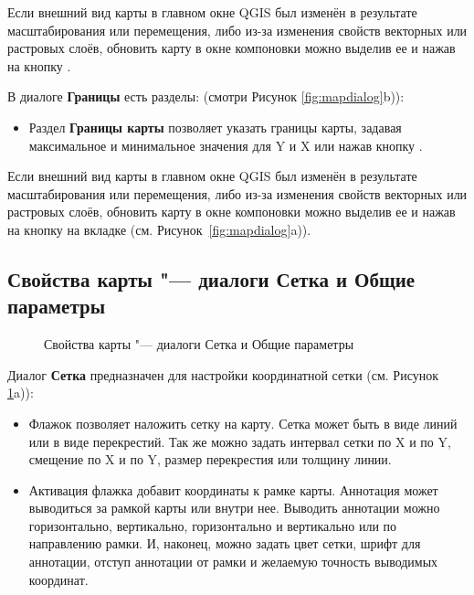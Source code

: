 Если внешний вид карты в главном окне QGIS был изменён в результате
масштабирования или перемещения, либо из-за изменения свойств векторных
или растровых слоёв, обновить карту в окне компоновки можно выделив ее
и нажав на кнопку .


В диалоге \textbf{Границы} есть разделы:
(смотри Рисунок \ref{fig:mapdialog}b)):

\begin{itemize}[label=--]
\item Раздел \textbf{Границы карты} позволяет указать границы карты,
задавая максимальное и минимальное значения для Y и X или нажав кнопку
.
\end{itemize}

Если внешний вид карты в главном окне QGIS был изменён в результате
масштабирования или перемещения, либо из-за изменения свойств векторных
или растровых слоёв, обновить карту в окне компоновки можно выделив ее
и нажав на кнопку  на вкладке  (см.
Рисунок~\ref{fig:mapdialog}a)).

\subsection{Свойства карты "--- диалоги Сетка и Общие параметры}

\begin{figure}[ht]
\centering
   \hspace{1cm}
   \caption{Свойства карты "--- диалоги Сетка и Общие параметры \wincaption}\label{fig:sec_map_dialog}
\end{figure}


Диалог \textbf{Сетка} предназначен для настройки координатной сетки
(см. Рисунок \ref{fig:sec_map_dialog}a)):

\begin{itemize}[label=--]
\item Флажок  позволяет наложить сетку на
карту. Сетка может быть в виде линий или в виде перекрестий. Так же
можно задать интервал сетки по X и по Y, смещение по X и по Y, размер
перекрестия или толщину линии.
\item Активация флажка  добавит
координаты к рамке карты. Аннотация может выводиться за рамкой карты или
внутри нее. Выводить аннотации можно горизонтально, вертикально,
горизонтально и вертикально или по направлению рамки. И, наконец, можно
задать цвет сетки, шрифт для аннотации, отступ аннотации от рамки и
желаемую точность выводимых координат.
\end{itemize}

